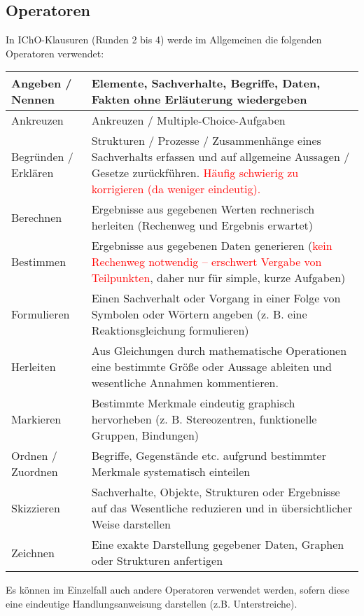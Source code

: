 \documentclass[./main.tex]{subfiles}
\begin{document}
\subsection{Operatoren}
In IChO-Klausuren (Runden 2 bis 4) werde im Allgemeinen die folgenden Operatoren verwendet:\\
\begin{tabular}{|C{2.2cm}|L{13.7cm}|}\hline
Angeben / Nennen & Elemente, Sachverhalte, Begriffe, Daten, Fakten ohne Erl\"auterung wiedergeben \\\hline
Ankreuzen & Ankreuzen / Multiple-Choice-Aufgaben \\\hline
Begr\"unden / Erkl\"aren & Strukturen / Prozesse / Zusammenh\"ange eines Sachverhalts erfassen und auf allgemeine Aussagen / Gesetze zur\"uckf\"uhren.\newline
\textcolor{red}{H\"aufig schwierig zu korrigieren (da weniger eindeutig).} \\\hline
Berechnen & Ergebnisse aus gegebenen Werten rechnerisch herleiten (Rechenweg und Ergebnis erwartet)\\\hline
Bestimmen & Ergebnisse aus gegebenen Daten generieren (\textcolor{red}{kein Rechenweg notwendig -- erschwert Vergabe von Teilpunkten}, daher nur f\"ur simple, kurze Aufgaben)\\\hline
Formulieren & Einen Sachverhalt oder Vorgang in einer Folge von Symbolen oder W\"ortern angeben (z. B. eine Reaktionsgleichung formulieren) \\\hline
Herleiten & Aus Gleichungen durch mathematische Operationen eine bestimmte Gr\"o\ss{}e oder Aussage ableiten und wesentliche Annahmen kommentieren. \\\hline
Markieren & Bestimmte Merkmale eindeutig graphisch hervorheben
(z. B. Stereozentren, funktionelle Gruppen, Bindungen) \\\hline
Ordnen / Zuordnen & Begriffe, Gegenst\"ande etc. aufgrund bestimmter Merkmale systematisch einteilen \\\hline
Skizzieren & Sachverhalte, Objekte, Strukturen oder Ergebnisse auf das Wesentliche reduzieren und in \"ubersichtlicher Weise darstellen \\\hline
Zeichnen & Eine exakte Darstellung gegebener Daten, Graphen oder Strukturen anfertigen \\\hline
\end{tabular}

Es k\"onnen im Einzelfall auch andere Operatoren verwendet werden, sofern diese eine eindeutige Handlungsanweisung darstellen (z.B. Unterstreiche). 
\end{document}
